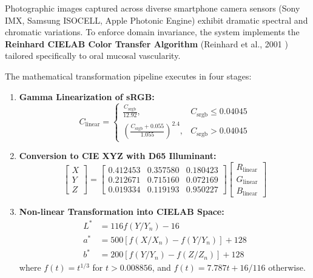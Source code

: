 \documentclass[12pt,a4paper,oneside]{report}
\begin{document}
Photographic images captured across diverse smartphone camera sensors (Sony IMX, Samsung ISOCELL, Apple Photonic Engine) exhibit dramatic spectral and chromatic variations. To enforce domain invariance, the system implements the \textbf{Reinhard CIELAB Color Transfer Algorithm} (Reinhard et al., 2001 \cite{reinhard2001color}) tailored specifically to oral mucosal vascularity.

The mathematical transformation pipeline executes in four stages:
\begin{enumerate}
    \item \textbf{Gamma Linearization of sRGB:}
    \begin{equation}
        C_{\text{linear}} = \begin{cases}
            \frac{C_{\text{srgb}}}{12.92}, & C_{\text{srgb}} \le 0.04045 \\
            \left( \frac{C_{\text{srgb}} + 0.055}{1.055} \right)^{2.4}, & C_{\text{srgb}} > 0.04045
        \end{cases}
    \end{equation}
    \item \textbf{Conversion to CIE XYZ with D65 Illuminant:}
    \begin{equation}
        \begin{bmatrix} X \\ Y \\ Z \end{bmatrix} = \begin{bmatrix}
            0.412453 & 0.357580 & 0.180423 \\
            0.212671 & 0.715160 & 0.072169 \\
            0.019334 & 0.119193 & 0.950227
        \end{bmatrix} \begin{bmatrix} R_{\text{linear}} \\ G_{\text{linear}} \\ B_{\text{linear}} \end{bmatrix}
    \end{equation}
    \item \textbf{Non-linear Transformation into CIELAB Space:}
    \begin{align}
        L^* &= 116 f(Y/Y_n) - 16 \\
        a^* &= 500 \left[ f(X/X_n) - f(Y/Y_n) \right] + 128 \\
        b^* &= 200 \left[ f(Y/Y_n) - f(Z/Z_n) \right] + 128
    \end{align}
    where $f(t) = t^{1/3}$ for $t > 0.008856$, and $f(t) = 7.787 t + 16/116$ otherwise.
    

\end{enumerate}
\end{document}
